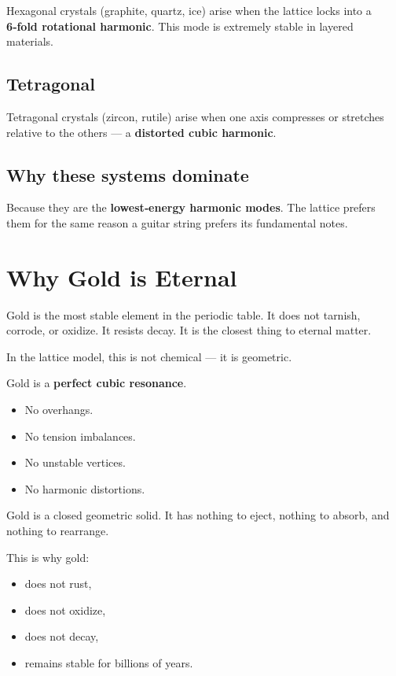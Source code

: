 \documentclass[11pt, letterpaper, openany]{book}
\begin{document}
Hexagonal crystals (graphite, quartz, ice) arise when the lattice locks into a \textbf{6‑fold
rotational harmonic}. This mode is extremely stable in layered materials.

\subsection*{Tetragonal}

Tetragonal crystals (zircon, rutile) arise when one axis compresses or stretches relative to
the others — a \textbf{distorted cubic harmonic}.

\subsection*{Why these systems dominate}

Because they are the \textbf{lowest‑energy harmonic modes}.  
The lattice prefers them for the same reason a guitar string prefers its fundamental notes.

\section{Why Gold is Eternal}

Gold is the most stable element in the periodic table. It does not tarnish, corrode, or
oxidize. It resists decay. It is the closest thing to eternal matter.

In the lattice model, this is not chemical — it is geometric.

Gold is a \textbf{perfect cubic resonance}.

\begin{itemize}
    \item No overhangs.
    \item No tension imbalances.
    \item No unstable vertices.
    \item No harmonic distortions.
\end{itemize}

Gold is a closed geometric solid.  
It has nothing to eject, nothing to absorb, and nothing to rearrange.

This is why gold:

\begin{itemize}
    \item does not rust,
    \item does not oxidize,
    \item does not decay,
    \item remains stable for billions of years.
\end{itemize}
\end{document}
